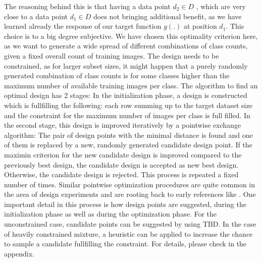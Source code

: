 \documentclass{article} %
\begin{document}
The reasoning behind this is that having a data point $d_2 \in D$ , which are very close to a data point $d_1 \in D$ does not bringing additional benefit, as we have learned already the response of
our target function $g(.)$ at position $d_1$.
This choice is to a big degree subjective. We have chosen this optimality criterion here, as we want to generate a wide spread of different combinations of class counts, given a fixed overall count of training images.
The design needs to be constrained, as for larger subset sizes, it might happen that a purely randomly generated combination of class counts is for some classes higher than the maximum number of available training images per class.
The algorithm to find an optimal design has 2 stages: In the initialization phase, a design is constructed which is fullfilling the following: each row summing up to the target dataset size and the constraint for the maximum number of images per class is full filled.
In the second stage, this design is improved iteratively by a pointwise exchange algorithm: The pair of design points with the minimal distance is found and one of them is replaced by a new, randomly generated candidate design point.
If the maximin criterion for the new candidate design is improved compared to the previously best design, the candidate design is accepted as new best design.
Otherwise, the candidate design is rejected. This process is repeated a fixed number of times.
Similar pointwise optimization procedures are quite common in the area of design experiments and are rooting back to early references like \cite{fedorov1972theory}.
One important detail in this process is how design points are suggested, during the initialization phase as well as during the optimization phase.
For the unconstrained case, candidate points can be suggested by using TBD. In the case of heavily constrained mixture, a heuristic can be applied to increase the chance to sample a candidate fullfilling the constraint. For details, please check in the appendix.
\end{document}
